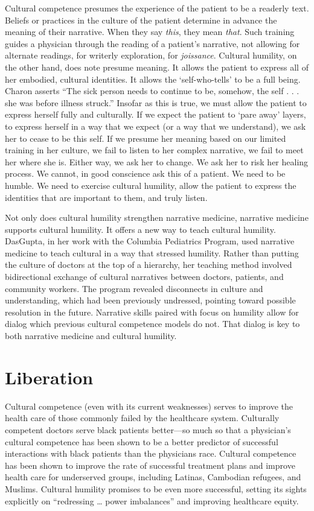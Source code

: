 \documentclass[12pt]{article}
\begin{document}
Cultural competence presumes the experience of the patient to be a readerly
text. Beliefs or practices in the culture of the patient determine in advance
the meaning of their narrative. When they say \emph{this}, they mean
\emph{that}.  Such training guides a physician through the reading of a
patient's narrative, not allowing for alternate readings, for writerly
exploration, for \emph{joissance}. Cultural humility, on the other hand, does
note presume meaning. It allows the patient to express all of her embodied, 
cultural identities. It allows the `self-who-tells' to be a full being.  Charon
asserts ``The sick person needs to continue to be, somehow, the self . .  . she
was before illness struck.''\autocite[p.~21]{Charon06} Insofar as this is true,
we must allow the patient to express herself fully and culturally. If we expect
the patient to `pare away' layers, to express herself in a way that we expect
(or a way that we understand), we ask her to cease to be this self. If we
presume her meaning based on our limited training in her culture, we fail to
listen to her complex narrative, we fail to meet her where she is. Either way,
we ask her to change. We ask her to risk her healing process. We cannot, in
good conscience ask this of a patient.  We need to be humble. We need to
exercise cultural humility, allow the patient to express the identities that
are important to them, and truly listen.

Not only does cultural humility strengthen narrative medicine, narrative
medicine supports cultural humility. It offers a new way to teach cultural
humility. DasGupta, in her work with the Columbia Pediatrics Program, used
narrative medicine to teach cultural  in a way that stressed
humility.\autocite{DasGupta06} Rather than putting the culture of doctors at
the top of a hierarchy, her teaching method involved bidirectional exchange of
cultural narratives between doctors, patients, and community workers. The
program revealed disconnects in culture and understanding, which had been
previously undressed, pointing toward possible resolution in the future.
Narrative skills paired with focus on humility allow for dialog which previous
cultural competence models do not. That dialog is key to both narrative
medicine and cultural humility.


\section{Liberation}

Cultural competence (even with its current weaknesses) serves to improve the
health care of those commonly failed by the healthcare system. Culturally
competent doctors serve black patients better---so much so that a physician's
cultural competence has been shown to be a better predictor of successful
interactions with black patients than the physicians
race.\autocite{Michalopoulou09} Cultural competence has been shown to improve
the rate of successful treatment plans and improve health care for underserved
groups, including Latinas, Cambodian refugees, and Muslims.\autocite{Padela08}
Cultural humility promises to be even more successful, setting its sights
explicitly on ``redressing \dots{} power imbalances''\autocite{Tervalon98} and
improving healthcare equity.
\end{document}
